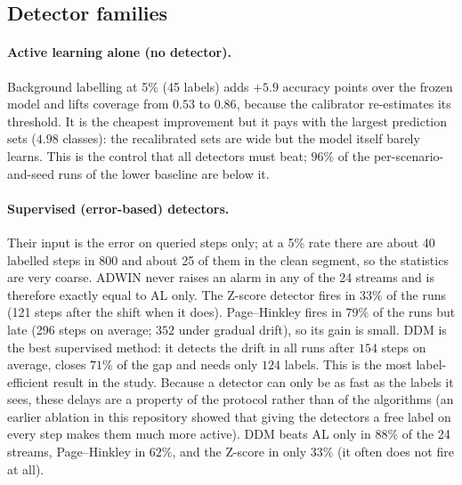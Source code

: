 \documentclass[11pt,a4paper]{article}
\begin{document}
\subsection{Detector families}

\paragraph{Active learning alone (no detector).} Background labelling at 5\% (45 labels) adds $+5.9$ accuracy points over the frozen model and lifts coverage from $0.53$ to $0.86$, because the calibrator re-estimates its threshold. It is the
cheapest improvement but it pays with the largest prediction sets ($4.98$ classes): the recalibrated sets are wide but the model itself barely learns.
This is the control that all detectors must beat; $96\%$ of the per-scenario-and-seed runs of the lower baseline are below it.

\paragraph{Supervised (error-based) detectors.} Their input is the error on queried steps only; at a 5\% rate there are about 40 labelled steps in 800 and about 25 of them in the clean segment, so the statistics are very coarse. ADWIN never raises an alarm in any of the 24 streams and is
therefore exactly equal to AL only. The Z-score detector fires in $33\%$ of the runs (121 steps after the shift when it does). Page--Hinkley fires in $79\%$ of the runs but late (296 steps on average; $352$ under gradual drift), so its gain is small. DDM is the best supervised method: it detects the drift in all runs after $154$ steps on average, closes $71\%$ of the gap and needs only $124$ labels.
This is the most label-efficient result in the study. Because a detector can only be as fast as the labels it sees, these delays are a property of the protocol rather than of the algorithms (an earlier ablation in this repository showed that giving the detectors a free label on every step makes them much more active).
DDM beats AL only in $88\%$ of the 24 streams, Page--Hinkley in $62\%$, and the Z-score in only $33\%$ (it often does not fire at all).
\end{document}

